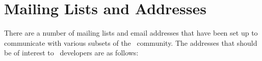 
\chapter{Mailing Lists and Addresses}
\label{chap:addresses}

There are a number of mailing lists and email addresses that have been set
up to communicate with various subsets of the \cgal\ community.  The
addresses that should be of interest to \cgal\ developers are as follows:

